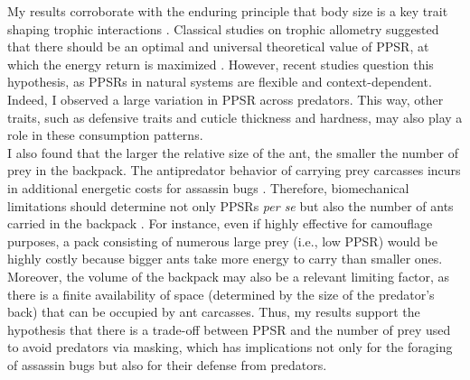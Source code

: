 \documentclass{article}
\begin{document}
My results corroborate with the enduring principle that body size is a key trait shaping trophic interactions \cite{petchey2008size}. Classical studies on trophic allometry suggested that there should be an optimal and universal theoretical value of PPSR, at which the energy return is maximized \cite{emerson1994allometric, west1997general}. However, recent studies question this hypothesis, as PPSRs in natural systems are flexible and context-dependent. Indeed, I observed a large variation in PPSR across predators. This way, other traits, such as defensive traits and cuticle thickness and hardness, may also play a role in these consumption patterns.
\\

I also found that the larger the relative size of the ant, the smaller the number of prey in the backpack. The antipredator behavior of carrying prey carcasses incurs in additional energetic costs for assassin bugs \cite{ruxton2015evolutionary}. Therefore, biomechanical limitations should determine not only PPSRs \textit{per se} but also the number of ants carried in the backpack \cite{charnov1976optimal}. For instance, even if highly effective for camouflage purposes, a pack consisting of numerous large prey (i.e., low PPSR) would be highly costly because bigger ants take more energy to carry than smaller ones. Moreover, the volume of the backpack may also be a relevant limiting factor, as there is a finite availability of space (determined by the size of the predator's back) that can be occupied by ant carcasses. Thus, my results support the hypothesis that there is a trade-off between PPSR and the number of prey used to avoid predators via masking, which has implications not only for the foraging of assassin bugs but also for their defense from predators.

\printbibliography[title={References}]
\end{document}
